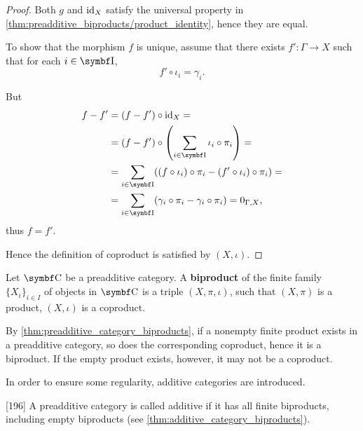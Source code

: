 \begin{proof}
  Both \( g \) and \( \operatorname{id}_X \) satisfy the universal property in \cref{thm:preadditive_biproducts/product_identity}, hence they are equal.

  To show that the morphism \( f \) is unique, assume that there exists \( f': \Gamma \to X \) such that for each \( i \in \Bold{I} \),
  \begin{equation*}
    f' \circ \iota_i = \gamma_i.
  \end{equation*}

  But
  \begin{align*}
    f - f'
    &=
    (f - f') \circ \Id_X
    = \\ &=
    (f - f') \circ \left( \sum_{i \in \Bold{I}} \iota_i \circ \pi_i \right)
    = \\ &=
    \sum_{i \in \Bold{I}} ((f \circ \iota_i) \circ \pi_i - (f' \circ \iota_i) \circ \pi_i)
    = \\ &=
    \sum_{i \in \Bold{I}} (\gamma_i \circ \pi_i - \gamma_i \circ \pi_i)
    =
    0_{\Gamma,X},
  \end{align*}
  thus \( f = f' \).

  Hence the definition of coproduct is satisfied by \( (X, \iota) \).
\end{proof}

\begin{definition}\label{def:categorical_biproduct}
  Let \( \Bold C \) be a preadditive category. A \textbf{biproduct} of the finite family \( \{ X_i \}_{i \in I} \) of objects in \( \Bold{C} \) is a triple \( (X, \pi, \iota) \), such that \( (X, \pi) \) is a product, \( (X, \iota) \) is a coproduct.
\end{definition}

\begin{note}\label{note:preadditive_category_biproducts}
  By \cref{thm:preadditive_category_biproducts}, if a nonempty finite product exists in a preadditive category, so does the corresponding coproduct, hence it is a biproduct. If the empty product exists, however, it may not be a coproduct.

  In order to ensure some regularity, additive categories are introduced.
\end{note}

\begin{definition}\label{def:additive_category}\cite{MacLane1994}[196]
  A preadditive category is called additive if it has all finite biproducts, including empty biproducts (see \cref{thm:additive_category_biproducts}).
\end{definition}

